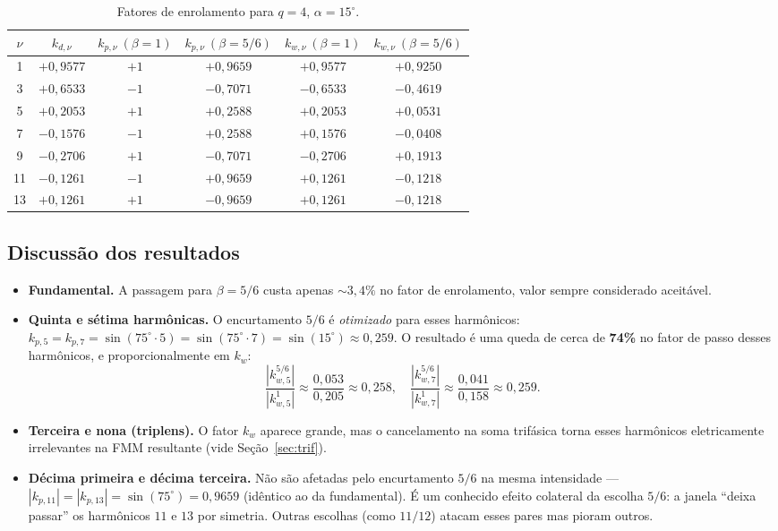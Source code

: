 \documentclass[12pt,a4paper]{article}
\begin{document}
\begin{table}[h]
\centering
\caption{Fatores de enrolamento para $q=4$, $\alpha=15^{\circ}$.}
\label{tab:fatores}
\renewcommand{\arraystretch}{1.15}
\begin{tabular}{c c c c c c}
\toprule
$\nu$ & $k_{d,\nu}$ & $k_{p,\nu}\ (\beta=1)$ & $k_{p,\nu}\ (\beta=5/6)$ & $k_{w,\nu}\ (\beta=1)$ & $k_{w,\nu}\ (\beta=5/6)$\\
\midrule
1  & $+0{,}9577$ & $+1$ & $+0{,}9659$ & $+0{,}9577$ & $+0{,}9250$ \\
3  & $+0{,}6533$ & $-1$ & $-0{,}7071$ & $-0{,}6533$ & $-0{,}4619$ \\
5  & $+0{,}2053$ & $+1$ & $+0{,}2588$ & $+0{,}2053$ & $+0{,}0531$ \\
7  & $-0{,}1576$ & $-1$ & $+0{,}2588$ & $+0{,}1576$ & $-0{,}0408$ \\
9  & $-0{,}2706$ & $+1$ & $-0{,}7071$ & $-0{,}2706$ & $+0{,}1913$ \\
11 & $-0{,}1261$ & $-1$ & $+0{,}9659$ & $+0{,}1261$ & $-0{,}1218$ \\
13 & $+0{,}1261$ & $+1$ & $-0{,}9659$ & $+0{,}1261$ & $-0{,}1218$ \\
\bottomrule
\end{tabular}
\end{table}

\subsection{Discussão dos resultados}

\begin{itemize}
    \item \textbf{Fundamental.} A passagem para $\beta=5/6$ custa apenas $\sim 3{,}4\%$ no fator de enrolamento, valor sempre considerado aceitável.
    
    \item \textbf{Quinta e sétima harmônicas.} O encurtamento $5/6$ é \emph{otimizado} para esses harmônicos: $k_{p,5}=k_{p,7}=\sin(75^{\circ}\cdot 5)=\sin(75^{\circ}\cdot 7)=\sin(15^{\circ})\approx 0{,}259$. O resultado é uma queda de cerca de \textbf{74\%} no fator de passo desses harmônicos, e proporcionalmente em $k_w$:
    \[
    \frac{|k_{w,5}^{5/6}|}{|k_{w,5}^{1}|} \approx \frac{0{,}053}{0{,}205} \approx 0{,}258,
    \quad
    \frac{|k_{w,7}^{5/6}|}{|k_{w,7}^{1}|} \approx \frac{0{,}041}{0{,}158} \approx 0{,}259.
    \]
    
    \item \textbf{Terceira e nona (triplens).} O fator $k_{w}$ aparece grande, mas o cancelamento na soma trifásica torna esses harmônicos eletricamente irrelevantes na FMM resultante (vide Seção~\ref{sec:trif}).
    
    \item \textbf{Décima primeira e décima terceira.} Não são afetadas pelo encurtamento $5/6$ na mesma intensidade --- $|k_{p,11}|=|k_{p,13}|=\sin(75^{\circ})=0{,}9659$ (idêntico ao da fundamental). É um conhecido efeito colateral da escolha $5/6$: a janela ``deixa passar'' os harmônicos $11$ e $13$ por simetria. Outras escolhas (como $11/12$) atacam esses pares mas pioram outros.
\end{itemize}
\end{document}
